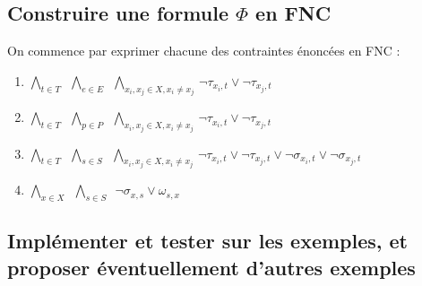 \documentclass[a4paper]{article}
\begin{document}
\subsection{Construire une formule $\Phi$ en FNC}
On commence par exprimer chacune des contraintes énoncées en FNC :

\begin{enumerate}
  \item $ \bigwedge\limits_{t \in T} \,\,\,
          \bigwedge\limits_{e \in E} \,\,\,
          \bigwedge\limits_{x_i, x_j \in X, x_i \neq x_j} \,
          \lnot \tau_{x_i,t} \lor \lnot \tau_{x_j,t}$
  \item $ \bigwedge\limits_{t \in T} \,\,\,
          \bigwedge\limits_{p \in P} \,\,\,
          \bigwedge\limits_{x_i, x_j \in X, x_i \neq x_j} \,
          \lnot \tau_{x_i,t} \lor \lnot \tau_{x_j,t}$
  \item $ \bigwedge\limits_{t \in T} \,\,\,
          \bigwedge\limits_{s \in S} \,\,\,
          \bigwedge\limits_{x_i, x_j \in X, x_i \neq x_j} \,
          \lnot \tau_{x_i,t} \lor \lnot \tau_{x_j,t} \lor \lnot \sigma_{x_i,t} \lor \lnot \sigma_{x_j,t}$
  \item $ \bigwedge\limits_{x \in X} \,\,\,
          \bigwedge\limits_{s \in S} \,\,\,
          \lnot \sigma_{x,s} \lor \omega_{s,x}$
\end{enumerate}

\subsection{Implémenter et tester sur les exemples, et proposer éventuellement d’autres exemples}
\end{document}
